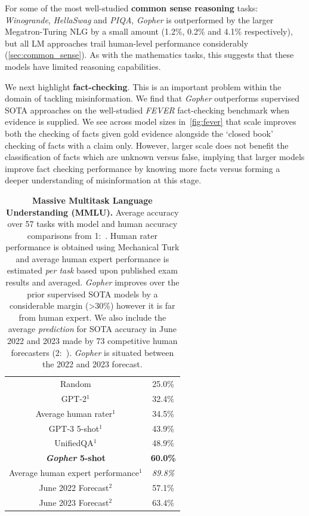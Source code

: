 \documentclass[11pt, a4paper, logo, internal, copyright, nonumbering]{deepmind}
\newcommand{\gopher}{\textit{Gopher}\xspace}
\begin{document}
For some of the most well-studied \textbf{common sense reasoning} tasks: \textit{Winogrande}, \textit{HellaSwag} and \textit{PIQA}, \gopher is outperformed by the larger Megatron-Turing NLG by a small amount (1.2\%, 0.2\% and 4.1\% respectively), but all LM approaches trail human-level performance considerably (\autoref{sec:common_sense}).  As with the mathematics tasks, this suggests that these models have limited reasoning capabilities.

We next highlight \textbf{fact-checking}. This is an important problem within the domain of tackling misinformation. We find that \gopher outperforms supervised SOTA approaches on the well-studied \textit{FEVER} fact-checking benchmark when evidence is supplied. We see across model sizes in~\autoref{fig:fever} that scale improves both the checking of facts given gold evidence alongside the `closed book' checking of facts with a claim only. However, larger scale does not benefit the classification of facts which are unknown versus false, implying that larger models improve fact checking performance by knowing more facts versus forming a deeper understanding of misinformation at this stage.

\begin{table}[t]
    \centering
    \begin{tabular}{cc}
    \toprule
        Random & 25.0\% \\
        GPT-2$^1$ &  32.4\% \\
        Average human rater$^1$ & 34.5\% \\
        GPT-3 5-shot$^1$ & 43.9\% \\
        UnifiedQA$^1$   & 48.9\% \\ 
        \textbf{\gopher 5-shot} & \textbf{60.0\%} \\
        Average human expert performance$^1$ & \textit{89.8\%} \\
        \midrule
        June 2022 Forecast$^2$& 57.1\% \\
        June 2023 Forecast$^2$& 63.4\% \\
         \bottomrule
    \end{tabular}
    \caption{\textbf{Massive Multitask Language Understanding (MMLU).} Average accuracy over 57 tasks with model and human accuracy comparisons from 1:~\citet{hendrycks2020measuring}. Human rater performance is obtained using Mechanical Turk and average human expert performance is estimated \textit{per task} based upon published exam results and averaged. \gopher improves over the prior supervised SOTA models by a considerable margin (>30\%) however it is far from human expert. We also include the average \textit{prediction} for SOTA accuracy in June 2022 and 2023 made by 73 competitive human forecasters (2:~\citet{forecast_blog}). \gopher is situated between the 2022 and 2023 forecast.}
    \label{tab:mmlu}
\end{table}
\end{document}
